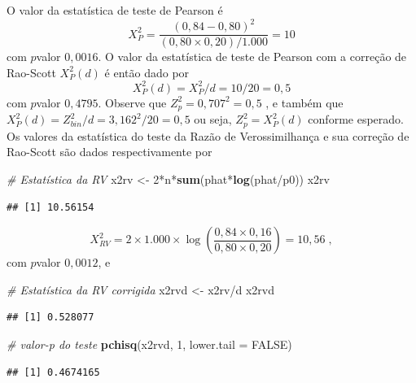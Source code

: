 \documentclass[]{book}
\newenvironment{Shaded}{\begin{snugshade}}{\end{snugshade}}
\newcommand{\KeywordTok}[1]{\textcolor[rgb]{0.13,0.29,0.53}{\textbf{{#1}}}}
\newcommand{\DataTypeTok}[1]{\textcolor[rgb]{0.13,0.29,0.53}{{#1}}}
\newcommand{\DecValTok}[1]{\textcolor[rgb]{0.00,0.00,0.81}{{#1}}}
\newcommand{\StringTok}[1]{\textcolor[rgb]{0.31,0.60,0.02}{{#1}}}
\newcommand{\CommentTok}[1]{\textcolor[rgb]{0.56,0.35,0.01}{\textit{{#1}}}}
\newcommand{\OtherTok}[1]{\textcolor[rgb]{0.56,0.35,0.01}{{#1}}}
\newcommand{\NormalTok}[1]{{#1}}
\numberwithin{example}{chapter}
\numberwithin{remark}{chapter}
\numberwithin{definition}{chapter}
\begin{document}
O valor da estatística de teste de Pearson é \[
X_{P}^{2}=\frac{\left( 0,84-0,80\right) ^{2}}{\left( 0,80\times 0,20\right)
/1.000}=10 
\] com \(p\)valor \(0,0016\). O valor da estatística de teste de Pearson
com a correção de Rao-Scott \(X_{P}^{2}(d)\) é então dado por \[
X_{P}^{2}(d)=X_{P}^{2}/d=10/20=0,5 
\] com \(p\)valor \(0,4795\). Observe que \(Z_{p}^{2}=0,707^{2}=0,5\) ,
e também que \(X_{P}^{2}(d)=Z_{bin}^{2}/d= 3,162^{2}/20=0,5\) ou seja,
\(Z_{p}^{2}=X_{P}^{2}(d)\) conforme esperado. Os valores da estatística
do teste da Razão de Verossimilhança e sua correção de Rao-Scott são
dados respectivamente por

\begin{Shaded}
\begin{Highlighting}[]
\CommentTok{# Estatística da RV}
\NormalTok{x2rv <-}\StringTok{ }\DecValTok{2}\NormalTok{*n*}\KeywordTok{sum}\NormalTok{(phat*}\KeywordTok{log}\NormalTok{(phat/p0))}
\NormalTok{x2rv}
\end{Highlighting}
\end{Shaded}

\begin{verbatim}
## [1] 10.56154
\end{verbatim}

\[
X_{RV}^{2}=2\times 1.000\times \log \left( \frac{0,84\times 0,16}{0,80\times
0,20}\right) =10,56\;, 
\] com \(p\)valor \(0,0012\), e

\begin{Shaded}
\begin{Highlighting}[]
\CommentTok{# Estatística da RV corrigida}
\NormalTok{x2rvd <-}\StringTok{ }\NormalTok{x2rv/d}
\NormalTok{x2rvd}
\end{Highlighting}
\end{Shaded}

\begin{verbatim}
## [1] 0.528077
\end{verbatim}

\begin{Shaded}
\begin{Highlighting}[]
\CommentTok{# valor-p do teste}
\KeywordTok{pchisq}\NormalTok{(x2rvd, }\DecValTok{1}\NormalTok{, }\DataTypeTok{lower.tail =} \OtherTok{FALSE}\NormalTok{)}
\end{Highlighting}
\end{Shaded}

\begin{verbatim}
## [1] 0.4674165
\end{verbatim}
\end{document}
